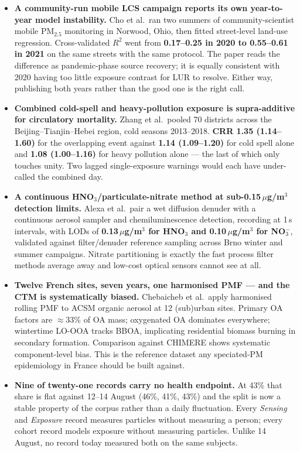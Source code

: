 \documentclass[10pt]{article}
\begin{document}
\footnotesize
\begin{itemize}
\item \textbf{A community-run mobile LCS campaign reports its own year-to-year model
instability.} Cho et al.\ ran two summers of community-scientist mobile PM$_{2.5}$
monitoring in Norwood, Ohio, then fitted street-level land-use regression. Cross-validated
$R^2$ went from \textbf{0.17--0.25 in 2020 to 0.55--0.61 in 2021} on the same streets with
the same protocol. The paper reads the difference as pandemic-phase source recovery; it is
equally consistent with 2020 having too little exposure contrast for LUR to resolve.
Either way, publishing both years rather than the good one is the right call.

\item \textbf{Combined cold-spell and heavy-pollution exposure is supra-additive for
circulatory mortality.} Zhang et al.\ pooled 70 districts across the Beijing--Tianjin--Hebei
region, cold seasons 2013--2018. \textbf{CRR 1.35 (1.14--1.60)} for the overlapping event
against \textbf{1.14 (1.09--1.20)} for cold spell alone and \textbf{1.08 (1.00--1.16)} for
heavy pollution alone --- the last of which only touches unity. Two lagged
single-exposure warnings would each have under-called the combined day.

\item \textbf{A continuous HNO$_3$/particulate-nitrate method at sub-0.15\,$\mu$g/m$^3$
detection limits.} Alexa et al.\ pair a wet diffusion denuder with a continuous aerosol
sampler and chemiluminescence detection, recording at 1\,s intervals, with LODs of
\textbf{0.13\,$\mu$g/m$^3$ for HNO$_3$ and 0.10\,$\mu$g/m$^3$ for NO$_3^-$}, validated
against filter/denuder reference sampling across Brno winter and summer campaigns. Nitrate
partitioning is exactly the fast process filter methods average away and low-cost optical
sensors cannot see at all.

\item \textbf{Twelve French sites, seven years, one harmonised PMF --- and the CTM is
systematically biased.} Chebaicheb et al.\ apply harmonised rolling PMF to ACSM organic
aerosol at 12 (sub)urban sites. Primary OA factors are $\approx$33\% of OA mass; oxygenated
OA dominates everywhere; wintertime LO-OOA tracks BBOA, implicating residential biomass
burning in secondary formation. Comparison against CHIMERE shows systematic component-level
bias. This is the reference dataset any speciated-PM epidemiology in France should be built
against.

\item \textbf{Nine of twenty-one records carry no health endpoint.} At 43\% that share is
flat against 12--14 August (46\%, 41\%, 43\%) and the split is now a stable property of the
corpus rather than a daily fluctuation. Every \textit{Sensing} and \textit{Exposure} record
measures particles without measuring a person; every cohort record models exposure without
measuring particles. Unlike 14 August, no record today measured both on the same subjects.
\end{itemize}
\end{document}
